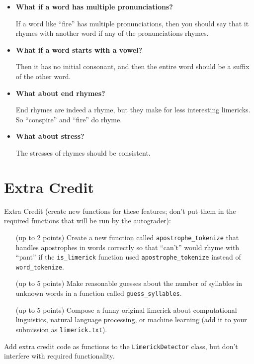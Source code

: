 \documentclass[11pt]{article}
\begin{document}
\begin{itemize}
\item {\bf What if a word has multiple pronunciations?}

If a word like “fire” has multiple pronunciations, then you should say
that it rhymes with another word if any of the pronunciations rhymes.

\item {\bf What if a word starts with a vowel?}

Then it has no initial consonant, and then the entire word should be a
suffix of the other word.


\item {\bf What about end rhymes?}

End rhymes are indeed a rhyme, but they make for less interesting
limericks.  So ``conspire'' and ``fire'' do rhyme.

\item {\bf What about stress?}

The stresses of rhymes should be consistent.

\end{itemize}

\section*{Extra Credit}

Extra Credit (create new functions for these features; don’t put them
in the required functions that will be run by the autograder):
\begin{itemize}
\item[(up to 2 points)] Create a new function called
  \texttt{apostrophe\_tokenize} that handles apostrophes in words correctly so
  that ``can’t'' would rhyme with ``pant'' if the \texttt{is\_limerick} function used \texttt{apostrophe\_tokenize} instead of \texttt{word\_tokenize}.
\item[(up to 5 points)] Make reasonable guesses about the number of syllables in unknown words in a function called \texttt{guess\_syllables}.
\item[(up to 5 points)] Compose a funny original limerick about
  computational linguistics, natural language processing, or machine
  learning (add it to your submission as \texttt{limerick.txt}).
\end{itemize}
Add extra credit code as functions to the \texttt{LimerickDetector}
class, but don't interfere with required functionality.
\end{document}
